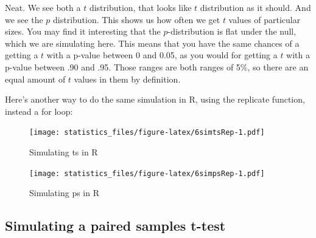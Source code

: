 \documentclass[]{book}
\newenvironment{Shaded}{\begin{snugshade}}{\end{snugshade}}
\newcommand{\DecValTok}[1]{\textcolor[rgb]{0.00,0.00,0.81}{#1}}
\newcommand{\KeywordTok}[1]{\textcolor[rgb]{0.13,0.29,0.53}{\textbf{#1}}}
\newcommand{\NormalTok}[1]{#1}
\newcommand{\OperatorTok}[1]{\textcolor[rgb]{0.81,0.36,0.00}{\textbf{#1}}}
\newcommand{\StringTok}[1]{\textcolor[rgb]{0.31,0.60,0.02}{#1}}
\begin{document}
Neat. We see both a \(t\) distribution, that looks like \(t\) distribution as it should. And we see the \(p\) distribution. This shows us how often we get \(t\) values of particular sizes. You may find it interesting that the \(p\)-distribution is flat under the null, which we are simulating here. This means that you have the same chances of a getting a \(t\) with a p-value between 0 and 0.05, as you would for getting a \(t\) with a p-value between .90 and .95. Those ranges are both ranges of 5\%, so there are an equal amount of \(t\) values in them by definition.

Here's another way to do the same simulation in R, using the replicate function, instead a for loop:

\begin{Shaded}
\end{Shaded}

\begin{figure}
\centering
\texttt{[image: statistics\_files/figure-latex/6simtsRep-1.pdf]}
\caption{\label{fig:6simtsRep}Simulating ts in R}
\end{figure}

\begin{Shaded}
\end{Shaded}

\begin{figure}
\centering
\texttt{[image: statistics\_files/figure-latex/6simpsRep-1.pdf]}
\caption{\label{fig:6simpsRep}Simulating ps in R}
\end{figure}

\hypertarget{simulating-a-paired-samples-t-test}{%
\subsection{Simulating a paired samples t-test}\label{simulating-a-paired-samples-t-test}}
\end{document}
